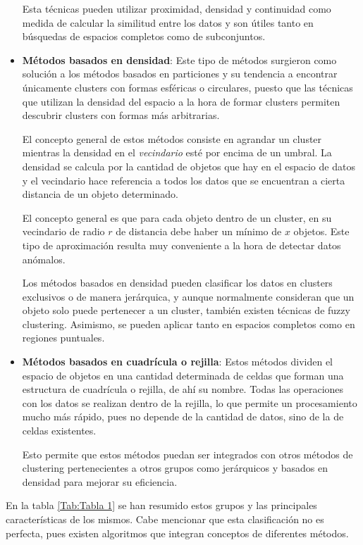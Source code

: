 \documentclass[10pt, a4paper]{article}
\begin{document}
\begin{itemize}
  Esta técnicas pueden utilizar proximidad, densidad y continuidad como medida de calcular la similitud entre los datos y son útiles tanto en búsquedas de espacios completos como de subconjuntos.
  
  \item \textbf{Métodos basados en densidad}: Este tipo de métodos surgieron como solución a los métodos basados en particiones y su tendencia a encontrar únicamente clusters con formas esféricas o circulares, puesto que las técnicas que utilizan la densidad del espacio a la hora de formar clusters permiten descubrir clusters con formas más arbitrarias. 
  
  El concepto general de estos métodos consiste en agrandar un cluster mientras la densidad en el \textit{vecindario} esté por encima de un umbral. La densidad se calcula por la cantidad de objetos que hay en el espacio de datos y el vecindario hace referencia a todos los datos que se encuentran a cierta distancia de un objeto determinado.
  
  El concepto general es que para cada objeto dentro de un cluster, en su vecindario de radio $r$ de distancia debe haber un mínimo de $x$ objetos. Este tipo de aproximación resulta muy conveniente a la hora de detectar datos anómalos.
  
  Los métodos basados en densidad pueden clasificar los datos en clusters exclusivos o de manera jerárquica, y aunque normalmente consideran que un objeto solo puede pertenecer a un cluster, también existen técnicas de fuzzy clustering. Asimismo, se pueden aplicar tanto en espacios completos como en regiones puntuales.
  
  \item \textbf{Métodos basados en cuadrícula o rejilla}: Estos métodos dividen el espacio de objetos en una cantidad determinada de celdas que forman una estructura de cuadrícula o rejilla, de ahí su nombre. Todas las operaciones con los datos se realizan dentro de la rejilla, lo que permite un procesamiento mucho más rápido, pues no depende de la cantidad de datos, sino de la de celdas existentes.
  
  Esto permite que estos métodos puedan ser integrados con otros métodos de clustering pertenecientes a otros grupos como jerárquicos y basados en densidad para mejorar su eficiencia.
\end{itemize}

En la tabla \ref{Tab:Tabla 1} se han resumido estos grupos y las principales características de los mismos. Cabe mencionar que esta clasificación no es perfecta, pues existen algoritmos que integran conceptos de diferentes métodos.
\end{document}
